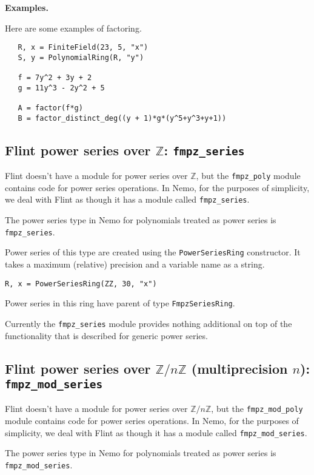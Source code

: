 \documentclass[a4paper,10pt]{article}
\newcommand{\Z}{\mathbb{Z}}
\newcommand{\code}{\lstinline}
\begin{document}
{{\textbf{Examples.}

Here are some examples of factoring.

\begin{lstlisting}
   R, x = FiniteField(23, 5, "x")
   S, y = PolynomialRing(R, "y")

   f = 7y^2 + 3y + 2
   g = 11y^3 - 2y^2 + 5

   A = factor(f*g)
   B = factor_distinct_deg((y + 1)*g*(y^5+y^3+y+1))
\end{lstlisting}

\subsection{Flint power series over $\Z$: \code{fmpz_series}}

Flint doesn't have a module for power series over $\Z$, but the \code{fmpz_poly}
module contains code for power series operations. In Nemo, for the purposes of
simplicity, we deal with Flint as though it has a module called \code{fmpz_series}.

The power series type in Nemo for polynomials treated as power series is
\code{fmpz_series}. 

Power series of this type are created using the \code{PowerSeriesRing} constructor.
It takes a maximum (relative) precision and a variable name as a string.

\begin{lstlisting}
R, x = PowerSeriesRing(ZZ, 30, "x")
\end{lstlisting}

Power series in this ring have parent of type \code{FmpzSeriesRing}.

Currently the \code{fmpz_series} module provides nothing additional on top of
the functionality that is described for generic power series.

\subsection{Flint power series over $\Z/n\Z$ (multiprecision $n$): \code{fmpz_mod_series}}

Flint doesn't have a module for power series over $\Z/n\Z$, but the \code{fmpz_mod_poly}
module contains code for power series operations. In Nemo, for the purposes of
simplicity, we deal with Flint as though it has a module called \code{fmpz_mod_series}.

The power series type in Nemo for polynomials treated as power series is
\code{fmpz_mod_series}. 

}}
\end{document}
